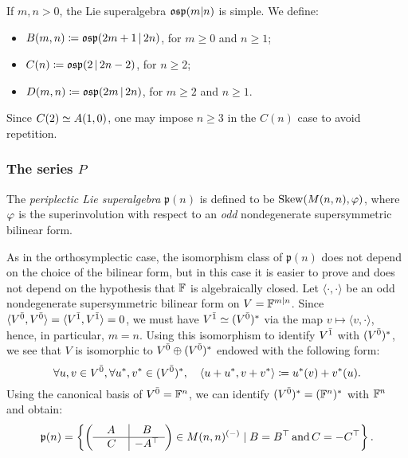 \label{defi:B-C-D}

If $m,n > 0$, the Lie superalgebra $\mathfrak{osp}(m|n)$ is simple. 
We define:
%
\begin{itemize}
	\item $B(m,n) \coloneqq \mathfrak{osp}(2m+1 \,|\, 2n)$, for $m \geq 0$ and $n \geq 1$;
	\item $C(n) \coloneqq \mathfrak{osp}(2 \,|\,  2n - 2)$, for $n\geq 2$;
	\item $D(m,n) \coloneqq \mathfrak{osp}(2m \,|\, 2n)$, for $m\geq 2$ and $n\geq 1$.
\end{itemize}
%
Since $C(2)\simeq A(1,0)$, one may impose $n\geq 3$ in the $C(n)$ case to avoid repetition.

\subsubsection{The series $P$}

The \emph{periplectic Lie superalgebra} $\mathfrak{p}(n)$ is defined to be $\operatorname{Skew}(M(n,n), \varphi)$, where $\varphi$ is the superinvolution with respect to an \emph{odd} nondegenerate supersymmetric bilinear form.

As in the orthosymplectic case, the isomorphism class of $\mathfrak{p}(n)$ does not depend on the choice of the bilinear form, but in this case it is easier to prove and does not depend on the hypothesis that $\mathbb{F}$ is algebraically closed. 
Let $\langle \cdot, \cdot \rangle$ be an odd nondegenerate supersymmetric bilinear form on $V = \mathbb{F}^{m|n}$. 
Since $\langle V^{\bar0}, V^{\bar0} \rangle = \langle V^{\bar1}, V^{\bar1} \rangle = 0$, we must have $V^{\bar1} \simeq (V^{\bar0})^*$ via the map $v \mapsto \langle v, \cdot \rangle$, hence, in particular, $m = n$. 
Using this isomorphism to identify $V^{\bar1}$ with $(V^{\bar0})^*$, we see that $V$ is isomorphic to $V^{\bar0} \oplus (V^{\bar0})^*$ endowed with the following form:
\[
    \forall u,v\in V^{\bar0}, \forall u^*,v^*\in (V^{\bar0})^*, \quad \langle u+u^*,v + v^* \rangle \coloneqq u^*(v) + v^*(u). 
\]
Using the canonical basis of $V^{\bar0} = \mathbb{F}^n$, we can identify $(V^{\bar0})^* = (\mathbb{F}^n)^*$ with $\mathbb{F}^n$ and obtain:  
\[
    \mathfrak{p}(n) = \left\{
    \left(\begin{array}{c|c}
        A & B\\
        \hline
        \phantom{-}C\phantom{\transp} & -A\transp
    \end{array}\right) \in M(n,n)^{(-)} \mid B=B\transp \AND C=-C\transp\right\}. 
\]

